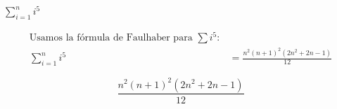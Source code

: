 $\displaystyle \sum_{i=1}^{n} i^5$

\nopagebreak
\begin{align*}
\text{Usamos la fórmula de Faulhaber para } \sum i^5: \\
\sum_{i=1}^{n} i^5 &= \frac{n^2(n+1)^2(2n^2+2n-1)}{12}
\end{align*}

\[
\boxed{\displaystyle \frac{n^2(n+1)^2(2n^2+2n-1)}{12}}
\]
